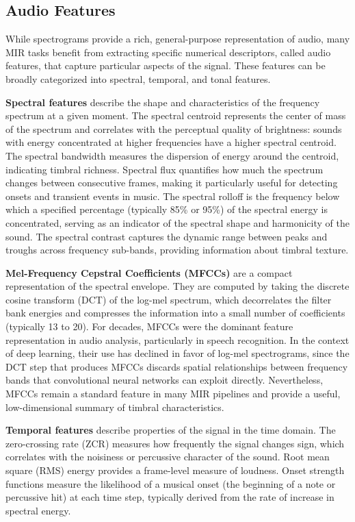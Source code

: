 \subsection{Audio Features}

While spectrograms provide a rich, general-purpose representation of audio, many MIR tasks benefit from extracting specific numerical descriptors, called audio features, that capture particular aspects of the signal. These features can be broadly categorized into spectral, temporal, and tonal features.

\textbf{Spectral features} describe the shape and characteristics of the frequency spectrum at a given moment. The spectral centroid represents the center of mass of the spectrum and correlates with the perceptual quality of brightness: sounds with energy concentrated at higher frequencies have a higher spectral centroid. The spectral bandwidth measures the dispersion of energy around the centroid, indicating timbral richness.  Spectral flux quantifies how much the spectrum changes between consecutive frames, making it particularly useful for detecting onsets and transient events in music. The spectral rolloff is the frequency below which a specified percentage (typically 85\% or 95\%) of the spectral energy is concentrated, serving as an indicator of the spectral shape and harmonicity of the sound. The spectral contrast captures the dynamic range between peaks and troughs across frequency sub-bands, providing information about timbral texture. 

\textbf{Mel-Frequency Cepstral Coefficients (MFCCs)} are a compact representation of the spectral envelope. They are computed by taking the discrete cosine transform (DCT) of the log-mel spectrum, which decorrelates the filter bank energies and compresses the information into a small number of coefficients (typically 13 to 20). For decades, MFCCs were the dominant feature representation in audio analysis, particularly in speech recognition.\cite{hendrikpurwins20191}  In the context of deep learning, their use has declined in favor of log-mel spectrograms, since the DCT step that produces MFCCs discards spatial relationships between frequency bands that convolutional neural networks can exploit directly.\cite{hendrikpurwins20191}  Nevertheless, MFCCs remain a standard feature in many MIR pipelines and provide a useful, low-dimensional summary of timbral characteristics.

\textbf{Temporal features} describe properties of the signal in the time domain. The zero-crossing rate (ZCR) measures how frequently the signal changes sign, which correlates with the noisiness or percussive character of the sound.  Root mean square (RMS) energy provides a frame-level measure of loudness. Onset strength functions measure the likelihood of a musical onset (the beginning of a note or percussive hit) at each time step, typically derived from the rate of increase in spectral energy.

